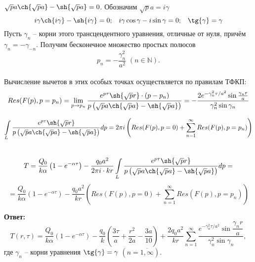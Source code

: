\documentclass[a4paper, 11pt]{article}
\newenvironment{solution}
    {\textit{}}
    {}
\begin{document}
\begin{solution}
	$\sqrt{p}a\ch{\sqrt{p}a}-\sh{\sqrt{p}a}=0$.
	Обозначим $\sqrt{p}a=i\gamma$\\
	$$i\gamma\ch{i\gamma}-\sh{i\gamma}=0;\,\,\,\,\,i\gamma\cos{\gamma}-i\sin{\gamma}=0;\,\,\,\,\,\tg{\gamma}=\gamma$$
	Пусть $\gamma_n$ -- корни этого трансцендентного уравнения, отличные от нуля, причём $\gamma_n=-\gamma_{-n}$. Получим бесконечное множество простых полюсов
	$$p_n=-\frac{\gamma_n^2}{a^2}\,\,\left(n\in\mathbb{N}\right).$$\\
	Вычисление вычетов в этих особых точках осуществляется по правилам ТФКП:\\
	$$Res(F(p),p=p_n)=\lim_{p\to p_n}\frac{e^{p\tau}\sh{\sqrt{p}r}\cdot\left(p-p_n\right)}{p\left(\sqrt{p}a\ch{\sqrt{p}a}-\sh{\sqrt{p}a}\right)}=-\frac{2e^{-\gamma_n^2\tau/a^2}\sin{\frac{\gamma_nr}{a}}}{\gamma_n^2\sin{\gamma_n}}$$
	
	$$\int\limits_{L}\frac{e^{p\tau}\sh{\sqrt{p}r}}{p\left(\sqrt{p}a\ch{\sqrt{p}a}-\sh{\sqrt{p}a}\right)}dp=2\pi i \left(Res(F(p),p=0)+\sum_{n=1}^{\infty}Res(F(p),p=p_n)\right)$$\\
	
	$$T=\frac{Q_0}{k\alpha}\left(1-e^{-\alpha\tau}\right)-\frac{q_0a^2}{2\pi i\cdot kr}\int\limits_{L}\frac{e^{p\tau}\sh{\sqrt{p}r}}{p\left(\sqrt{p}a\ch{\sqrt{p}a}-\sh{\sqrt{p}a}\right)}dp=$$ $$=\frac{Q_0}{k\alpha}\left(1-e^{-\alpha\tau}\right)-\frac{q_0a^2}{kr}\left(Res(F(p),p=0)+\sum_{n=1}^{\infty}Res(F(p),p=p_n)\right)$$
	
\textbf{Ответ:}
	$$T(r,\tau)=\frac{Q_0}{k\alpha}\left(1-e^{-\alpha\tau}\right)-\frac{q_0}{k}\left(\frac{3\tau}{a}+\frac{r^2}{2a}-\frac{3a}{10}\right)+\frac{2q_0a^2}{kr}\sum_{n=1}^{\infty}\frac{e^{-\gamma_n^2\tau/a^2}\sin{\dfrac{\gamma_nr}{a}}}{\gamma_n^2\sin{\gamma_n}},$$ где $\gamma_n$ -- корни уравнения $\tg{\gamma}=\gamma$ $\left(n=\overline{1,\infty}\right)$.
		
\end{solution}
 
\end{document}
